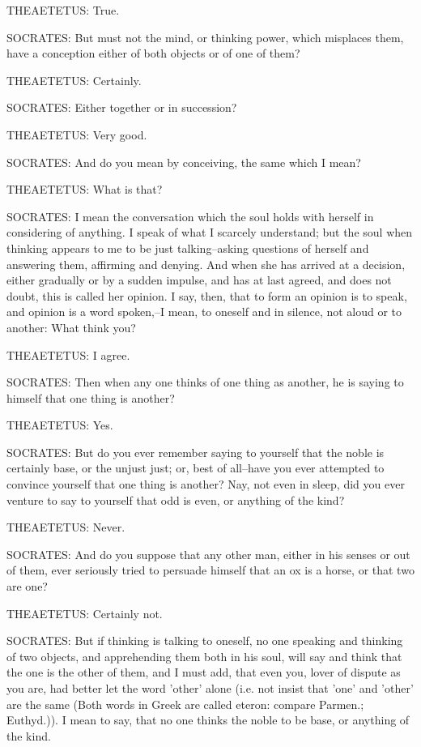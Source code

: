 THEAETETUS: True.

SOCRATES: But must not the mind, or thinking power, which misplaces
them, have a conception either of both objects or of one of them?

THEAETETUS: Certainly.

SOCRATES: Either together or in succession?

THEAETETUS: Very good.

SOCRATES: And do you mean by conceiving, the same which I mean?

THEAETETUS: What is that?

SOCRATES: I mean the conversation which the soul holds with herself in
considering of anything. I speak of what I scarcely understand; but the
soul when thinking appears to me to be just talking--asking questions
of herself and answering them, affirming and denying. And when she has
arrived at a decision, either gradually or by a sudden impulse, and has
at last agreed, and does not doubt, this is called her opinion. I
say, then, that to form an opinion is to speak, and opinion is a word
spoken,--I mean, to oneself and in silence, not aloud or to another:
What think you?

THEAETETUS: I agree.

SOCRATES: Then when any one thinks of one thing as another, he is saying
to himself that one thing is another?

THEAETETUS: Yes.

SOCRATES: But do you ever remember saying to yourself that the noble
is certainly base, or the unjust just; or, best of all--have you ever
attempted to convince yourself that one thing is another? Nay, not even
in sleep, did you ever venture to say to yourself that odd is even, or
anything of the kind?

THEAETETUS: Never.

SOCRATES: And do you suppose that any other man, either in his senses
or out of them, ever seriously tried to persuade himself that an ox is a
horse, or that two are one?

THEAETETUS: Certainly not.

SOCRATES: But if thinking is talking to oneself, no one speaking and
thinking of two objects, and apprehending them both in his soul, will
say and think that the one is the other of them, and I must add, that
even you, lover of dispute as you are, had better let the word 'other'
alone (i.e. not insist that 'one' and 'other' are the same (Both words
in Greek are called eteron: compare Parmen.; Euthyd.)). I mean to say,
that no one thinks the noble to be base, or anything of the kind.

